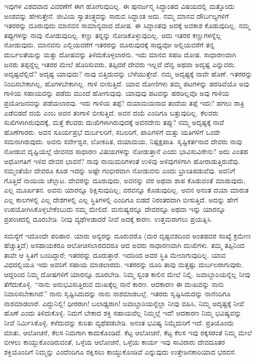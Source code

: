 ಇವುಗಳ ವಿಶದವಾದ ವಿವರಣೆಗೆ ಈಗ ಹೋಗುವುದಿಲ್ಲ. ಈ ಪುನರ್ಜನ್ಮ ಸಿದ್ಧಾಂತದ ವಿಷಯದಲ್ಲಿ ಮತ್ತೊಂದು ಅಂಶವನ್ನು ಹೇಳುತ್ತೇನೆ. ಜೀವಿಯ ಸ್ವಾತಂತ್ರ್ಯವನ್ನು ಸಾರುವ ಸಿದ್ಧಾಂತ ಅದು. ನಮ್ಮ ಮಾನವ ದೌರ್ಬಲ್ಯಗಳಿಗೆ ಇತರರನ್ನು ದೂರುವುದು ಮಾನವನ ಸಾಮಾನ್ಯವಾದ ದೋಷ. ಈ ಸಿದ್ಧಾಂತವು ಅದಕ್ಕೆ ಅವಕಾಶ ಕೊಡುವುದಿಲ್ಲ. ನಮ್ಮ ತಪ್ಪುಗಳನ್ನು ನಾವು ನೋಡುವುದಿಲ್ಲ. ಕಣ್ಣು ತನ್ನನ್ನು ನೋಡಿಕೊಳ್ಳುವುದಿಲ್ಲ. ಅದು ಇತರರ ಕಣ್ಣುಗಳನ್ನೆಲ್ಲ ನೋಡುವುದು. ಮಾನವನು ಎಲ್ಲಿಯವರೆಗೆ ಇತರರನ್ನು ದೂರುವುದಕ್ಕೆ ಸಾಧ್ಯವೋ ಅಲ್ಲಿಯವರೆಗೆ ತನ್ನ ದುರ್ಬಲತೆಯನ್ನು ಮತ್ತು ದೋಷವನ್ನು ತಿಳಿದುಕೊಳ್ಳಲಾರನು. ಇದು ಮಾನವ ಸಹಜ ದೋಷ. ಸಾಧಾರಣವಾಗಿ ಜನರು ತಪ್ಪನ್ನೆಲ್ಲ ಇತರರ ಮೇಲೆ ಹೊರಿಸುವರು, ತಪ್ಪಿದರೆ ದೇವರು ಇಲ್ಲವೆ ದೆವ್ವ ಅಥವಾ ಅದೃಷ್ಟ ಎನ್ನುವರು. ಅದೃಷ್ಟವೆಲ್ಲಿದೆ? ಅದೃಷ್ಟ ಯಾವುದು? ನಾವು ಬಿತ್ತಿದುದನ್ನು ಬೆಳೆಯುತ್ತೇವೆ. ನಮ್ಮ ಅದೃಷ್ಟಕ್ಕೆ ನಾವೇ ಹೊಣೆ. ಇತರರನ್ನು ನಿಂದಿಸಬೇಕಾಗಿಲ್ಲ, ಹೊಗಳಬೇಕಾಗಿಲ್ಲ. ಗಾಳಿ ಬೀಸುತ್ತಿದೆ. ಯಾವ ದೋಣಿಗಳು ತಮ್ಮ ಪಟಗಳನ್ನು ಹರಡಿವೆಯೊ ಅವು ಗಾಳಿಯ ಸಹಾಯವನ್ನು ಪಡೆದು ಮುಂದೆ ಹೋಗುವುವು. ಯಾವುವು ಪಟವನ್ನು ಹರಡಿಲ್ಲವೊ ಅವು ಗಾಳಿಯ ಪ್ರಯೋಜನವನ್ನು ಪಡೆಯಲಾರವು. ಇದು ಗಾಳಿಯ ತಪ್ಪೆ? ದಯಾಮಯನಾದ ತಂದೆಯ ತಪ್ಪೆ ಇದು? ಹಗಲು ರಾತ್ರಿ ಎಡೆಬಿಡದೆ ದಯೆ ಎಂಬ ಅವನ ತಂಗಾಳಿ ಬೀಸುತ್ತಿದೆ. ಅವನ ದಯೆ ಎಂದಿಗೂ ಬತ್ತುವುದಿಲ್ಲ. ಕೆಲವರು ಸುಖಿಗಳಾಗಿರುವುದಕ್ಕೆ, ಮತ್ತೆ ಕೆಲವರು ದುಃಖಿಗಳಾಗಿರುವುದಕ್ಕೆ ಅವನದೇನು ತಪ್ಪು? ನಮ್ಮ ಅದೃಷ್ಟಕ್ಕೆ ನಾವೆ ಹೊಣೆಗಾರರು. ಅವನ ಸೂರ್ಯಪ್ರಭೆ ದುರ್ಬಲರಿಗೆ, ಸಬಲರಿಗೆ, ಪಾಪಿಗಳಿಗೆ ಮತ್ತು ಯತಿಗಳಿಗೆ ಒಂದೇ ಸಮನಾಗಿರುವುದು. ಅವನು ಸರ್ವೇಶ್ವರ, ಲೋಕಪಿತ, ದಯಾಮಯ, ನಿಷ್ಪಕ್ಷಪಾತಿ. ಸೃಷ್ಟಿಕರ್ತನಾದ ದೇವರು ನಾವು ನೋಡುವ ದೃಷ್ಟಿಯಲ್ಲೆ ಜೀವನದ ಸಾಧಾರಣ ವಿಷಯಗಳನ್ನು ನೋಡುತ್ತಾನೆ ಎಂದು ಭಾವಿಸುವಿರೇನು? ಅದು ಎಂತಹ ಅಧೋಗತಿಗೆ ಇಳಿದ ದೇವರ ಭಾವನೆ? ನಾವು ನಾಯಿಮರಿಗಳಂತೆ ಉಳಿವು ಅಳಿವುಗಳಿಗಾಗಿ ಹೋರಾಡುತ್ತಿರುವೆವು. ನಮ್ಮಂತೆಯೇ ದೇವರೂ ಕೂಡ ಇದನ್ನು ಅಷ್ಟೇ ಗಂಭೀರವಾಗಿ ನೋಡುವನು ಎಂದು ಭ್ರಾಂತಿಪಡುವೆವು. ಅವನಿಗೆ ಗೊತ್ತಿದೆ ನಾಯಿಯ ಚೆಲ್ಲಾಟ. ದೇವರನ್ನು ದೂರುವುದು, ಅವನನ್ನು ವರ ಅಥವಾ ಶಾಪ ಕೊಡುವಂತೆ ಮಾಡುವುದು, ಎಲ್ಲ ಮೂರ್ಖತನ. ಅವನು ಯಾರನ್ನೂ ಶಿಕ್ಷಿಸುವುದಿಲ್ಲ; ವರವನ್ನೂ ಕೊಡುವುದಿಲ್ಲ. ಅವನ ಅನಂತ ದಯಾ ಮಾರುತ ಎಲ್ಲ ಕಾಲಗಳಲ್ಲಿ ಎಲ್ಲ ದೇಶಗಳಲ್ಲಿ ಎಲ್ಲ ಸ್ಥಿತಿಗಳಲ್ಲಿ ಎಂದಿಗೂ ಬಿಡದೆ ನಿರಂತರವಾಗಿ ಬೀಸುತ್ತಿದೆ. ಅದನ್ನು ಹೇಗೆ ಉಪಯೋಗಿಸಿಕೊಳ್ಳಬೇಕೆಂಬುದು ನಮ್ಮ ಮೇಲಿದೆ. ಮನುಷ್ಯರನ್ನೂ ದೇವರನ್ನೂ ಅಥವಾ ಇನ್ನು ಯಾರನ್ನೂ ಪ್ರಪಂಚದಲ್ಲಿ ದೂರಬೇಡಿ. ನೀವು ವ್ಯಥೆಗೀಡಾದರೆ ನೀವೆ ಅದಕ್ಕೆ ಕಾರಣ. ಉತ್ತಮರಾಗಲು ಪ್ರಯತ್ನಿಸಿ.

\vskip 0.2cm

ಸಮಸ್ಯೆಗೆ ಇದೊಂದೇ ಪರಿಹಾರ. ಯಾರು ಅನ್ಯರನ್ನು ದೂರುವರೊ (ದುರ ದೃಷ್ಟವಶದಿಂದ ಅಂತಹವರ ಸಂಖ್ಯೆ ಕ್ರಮೇಣ ಹೆಚ್ಚುತ್ತಿದೆ) ಅಸಹಾಯಕರೂ ಆಲೋಚಿಸಲಾರದವರೂ ಆದ ಅವರು ಸಾಧಾರಣವಾಗಿ ದುಃಖಿಗಳು. ತಮ್ಮ ತಪ್ಪಿನಿಂದ ತಾವೇ ಆ ಸ್ಥಿತಿಗೆ ಬಂದಿದ್ದಾರೆ; ಇತರರನ್ನು ದೂರುತ್ತಾರೆ. ಇದರಿಂದ ಅವರ ಸ್ಥಿತಿ ಮೇಲಾಗುವುದಿಲ್ಲ. ಯಾವ ವಿಧದಲ್ಲಿಯೂ ಇದು ಅವರಿಗೆ ಸಹಾಯ ಮಾಡಲಾರದು. ಇತರರನ್ನು ದೂರಿ ತಾವು ಮತ್ತಷ್ಟು ದುರ್ಬಲರಾಗುವುರು. ಆದ್ದರಿಂದ ನಿಮ್ಮ ದೋಷಗಳಿಗೆ ಯಾರನ್ನೂ ದೂರಬೇಡಿ. ನಿಮ್ಮ ಸ್ವಂತ ಕಾಲಿನ ಮೇಲೆ ನಿಲ್ಲಿ. ಜವಾಬ್ದಾರಿಯನ್ನೆಲ್ಲ ನೀವು ತೆಗೆದುಕೊಳ್ಳಿ. “ನಾನು ಅನುಭವಿಸುತ್ತಿರುವ ದುಃಖಕ್ಕೆಲ್ಲ ನಾನೆ ಕಾರಣ. ಆದಕಾರಣ ಈ ದುಃಖವನ್ನು ನಾನು ನಿವಾರಿಸಬೇಕಾಗಿದೆ.” ನಾನು ಸೃಷ್ಟಿಸಿದುದನ್ನು ನಾನು ನಾಶಮಾಡಬಲ್ಲೆ. ಇತರರು ಸೃಷ್ಟಿಸಿದುದನ್ನು ನಾನೆಂದಿಗೂ ನಾಶಮಾಡಲಾರೆ. ಎದ್ದುನಿಲ್ಲಿ! ಧೀರರಾಗಿ! ಬಲಾಢ್ಯರಾಗಿ! ಜವಾಬ್ದಾರಿಯನ್ನೆಲ್ಲಾ ನೀವು ವಹಿಸಿ, ನಿಮ್ಮ ಅದೃಷ್ಟಕ್ಕೆ ನೀವೆ ಹೊಣೆ ಎಂದು ತಿಳಿದುಕೊಳ್ಳಿ. ನಿಮಗೆ ಬೇಕಾದ ಶಕ್ತಿ ಸಹಾಯವೆಲ್ಲ ನಿಮ್ಮಲ್ಲೆ ಇದೆ! ಆದಕಾರಣ ನಿಮ್ಮ ಭವಿಷ್ಯವನ್ನು ನೀವೆ ನಿರ್ಮಿಸಿಕೊಳ್ಳಿ. ಕಳೆದುದನ್ನು ಕುರಿತು ವ್ಯಥೆಪಡಬೇಡಿ. ಅನಂತ ಭವಿಷ್ಯ ನಿಮ್ಮೆದುರಿಗೆ ಇದೆ. ಪ್ರತಿಯೊಂದು ಮಾತು, ಆಲೋಚನೆ, ಕೆಲಸ ನಿಮಗಾಗಿ ಕಾದುಕೊಂಡಿದೆ. ಕೆಟ್ಟ ಆಲೋಚನೆ, ಕೆಟ್ಟ ಕೆಲಸ ಇವು ರಕ್ಕಸರಂತೆ ನಿಮ್ಮ ಮೇಲೆ ಬೀಳಲು ಕಾಯ್ದುಕೊಂಡಿರುವಂತೆ, ಒಳ್ಳೆಯ ಆಲೋಚನೆ, ಒಳ್ಳೆಯ ಕಾರ್ಯ ಇವು ಸಾವಿರಾರು ದೇವದೂತರ ಶಕ್ತಿಯೊಂದಿಗೆ ನಿಮ್ಮನ್ನು ಎಂದೆಂದಿಗೂ ರಕ್ಷಿಸಲು ಕಾಯ್ದುಕೊಂಡಿವೆ ಎನ್ನುವುದು ಉತ್ತೇಜನಕಾರಿಯಾದ ಭರವಸೆ.

